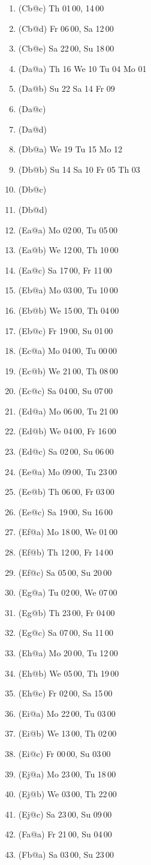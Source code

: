 \documentclass{article}
\begin{document}
\begin{enumerate}
\item(Cb@c) Th 01\,00, 14\,00
\item(Cb@d) Fr 06\,00, Sa 12\,00
\item(Cb@e) Sa 22\,00, Su 18\,00
\item(Da@a) Th 16 We 10 Tu 04 Mo 01
\item(Da@b) Su 22 Sa 14 Fr 09
\item(Da@c)
\item(Da@d)
\item(Db@a) We 19 Tu 15 Mo 12
\item(Db@b) Su 14 Sa 10 Fr 05 Th 03
\item(Db@c)
\item(Db@d)
\item(Ea@a) Mo 02\,00, Tu 05\,00
\item(Ea@b) We 12\,00, Th 10\,00
\item(Ea@c) Sa 17\,00, Fr 11\,00
\item(Eb@a) Mo 03\,00, Tu 10\,00
\item(Eb@b) We 15\,00, Th 04\,00
\item(Eb@c) Fr 19\,00, Su 01\,00
\item(Ec@a) Mo 04\,00, Tu 00\,00
\item(Ec@b) We 21\,00, Th 08\,00
\item(Ec@c) Sa 04\,00, Su 07\,00
\item(Ed@a) Mo 06\,00, Tu 21\,00
\item(Ed@b) We 04\,00, Fr 16\,00
\item(Ed@c) Sa 02\,00, Su 06\,00
\item(Ee@a) Mo 09\,00, Tu 23\,00
\item(Ee@b) Th 06\,00, Fr 03\,00
\item(Ee@c) Sa 19\,00, Su 16\,00
\item(Ef@a) Mo 18\,00, We 01\,00
\item(Ef@b) Th 12\,00, Fr 14\,00
\item(Ef@c) Sa 05\,00, Su 20\,00
\item(Eg@a) Tu 02\,00, We 07\,00
\item(Eg@b) Th 23\,00, Fr 04\,00
\item(Eg@c) Sa 07\,00, Su 11\,00
\item(Eh@a) Mo 20\,00, Tu 12\,00
\item(Eh@b) We 05\,00, Th 19\,00
\item(Eh@c) Fr 02\,00, Sa 15\,00
\item(Ei@a) Mo 22\,00, Tu 03\,00
\item(Ei@b) We 13\,00, Th 02\,00
\item(Ei@c) Fr 00\,00, Su 03\,00
\item(Ej@a) Mo 23\,00, Tu 18\,00
\item(Ej@b) We 03\,00, Th 22\,00
\item(Ej@c) Sa 23\,00, Su 09\,00
\item(Fa@a) Fr 21\,00, Su 04\,00
\item(Fb@a) Sa 03\,00, Su 23\,00
\end{enumerate}
\end{document}
